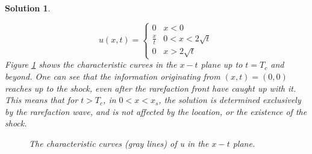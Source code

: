 \documentclass[10pt,letterpaper]{article}
\theoremstyle{break}
\newtheorem{mysolution}{Solution}
\newenvironment{solution}{\begin{mysolution}}{\end{mysolution}}
\begin{document}
\begin{solution}
\begin{itemize}
    $$
    u(x, t)=\left\{\begin{array}{ll}
    0 & x<0 \\
    \frac{x}{t} & 0<x<2 \sqrt{t} \\
    0 & x>2 \sqrt{t}
    \end{array}\right.
    $$
    Figure \ref{problem3_part2} shows the characteristic curves in the $x-t$ plane up to $t=T_{c}$ and beyond. One can see that the information originating from $(x, t)=(0,0)$ reaches up to the shock, even after the rarefaction front have caught up with it. This means that for $t>T_{c}$, in $0<x<x_{s}$, the solution is determined exclusively by the rarefaction wave, and is not affected by the location, or the existence of the shock.
    
    \begin{figure}
        \centering
        \begin{subfigure}[b]{0.5\textwidth}
        \end{subfigure}
        \caption{The characteristic curves (gray lines) of u in the $x-t$ plane.}
        \label{problem3_part2}
    \end{figure}
    \end{itemize}
    
    
\end{solution}
\end{document}
